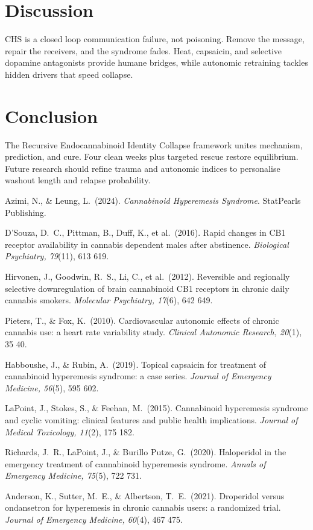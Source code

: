 \documentclass[11pt]{article}
\begin{document}
\section{Discussion}
CHS is a closed loop communication failure, not poisoning. Remove the message, repair the receivers, and the syndrome fades. Heat, capsaicin, and selective dopamine antagonists provide humane bridges, while autonomic retraining tackles hidden drivers that speed collapse.

\section{Conclusion}
The Recursive Endocannabinoid Identity Collapse framework unites mechanism, prediction, and cure. Four clean weeks plus targeted rescue restore equilibrium. Future research should refine trauma and autonomic indices to personalise washout length and relapse probability.

\begin{thebibliography}{99}

Azimi, N., \& Leung, L.\ (2024). \textit{Cannabinoid Hyperemesis Syndrome}. StatPearls Publishing.

D'Souza, D.\ C., Pittman, B., Duff, K., et al.\ (2016). Rapid changes in CB1 receptor availability in cannabis dependent males after abstinence. \textit{Biological Psychiatry, 79}(11), 613 619.

Hirvonen, J., Goodwin, R.\ S., Li, C., et al.\ (2012). Reversible and regionally selective downregulation of brain cannabinoid CB1 receptors in chronic daily cannabis smokers. \textit{Molecular Psychiatry, 17}(6), 642 649.

Pieters, T., \& Fox, K.\ (2010). Cardiovascular autonomic effects of chronic cannabis use: a heart rate variability study. \textit{Clinical Autonomic Research, 20}(1), 35 40.

Habboushe, J., \& Rubin, A.\ (2019). Topical capsaicin for treatment of cannabinoid hyperemesis syndrome: a case series. \textit{Journal of Emergency Medicine, 56}(5), 595 602.

LaPoint, J., Stokes, S., \& Feehan, M.\ (2015). Cannabinoid hyperemesis syndrome and cyclic vomiting: clinical features and public health implications. \textit{Journal of Medical Toxicology, 11}(2), 175 182.

Richards, J.\ R., LaPoint, J., \& Burillo Putze, G.\ (2020). Haloperidol in the emergency treatment of cannabinoid hyperemesis syndrome. \textit{Annals of Emergency Medicine, 75}(5), 722 731.

Anderson, K., Sutter, M.\ E., \& Albertson, T.\ E.\ (2021). Droperidol versus ondansetron for hyperemesis in chronic cannabis users: a randomized trial. \textit{Journal of Emergency Medicine, 60}(4), 467 475.

\end{thebibliography}
\end{document}
